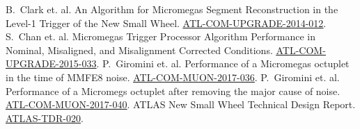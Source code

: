 \begin{thebibliography}{99}
\label{bibliography}
\setlength{\itemsep}{1.5pt plus 2.0pt minus 1.4pt}
\setlength{\parsep}{0pt}
\setlength{\parskip}{0pt}
\vspace{-6pt}

 B.~Clark et. al. An Algorithm for Micromegas Segment Reconstruction in the Level-1 Trigger of the New Small Wheel. \href{https://cds.cern.ch/record/1706160}{\color{blue}\underline{ATL-COM-UPGRADE-2014-012}}.
 S.~Chan et. al. Micromegas Trigger Processor Algorithm Performance in Nominal, Misaligned, and Misalignment Corrected Conditions. \href{https://cds.cern.ch/record/2113121}{\color{blue}\underline{ATL-COM-UPGRADE-2015-033}}.
 P.~Giromini et. al. Performance of a Micromegas octuplet in the time of MMFE8 noise. \href{https://cds.cern.ch/record/2272355}{\color{blue}\underline{ATL-COM-MUON-2017-036}}.
 P.~Giromini et. al. Performance of a Micromegs octuplet after removing the major cause of noise. \href{https://cds.cern.ch/record/2277316}{\color{blue}\underline{ATL-COM-MUON-2017-040}}.
 ATLAS New Small Wheel Technical Design Report. \href{http://cds.cern.ch/record/1552862}{\color{blue}\underline{ATLAS-TDR-020}}.

\end{thebibliography}








